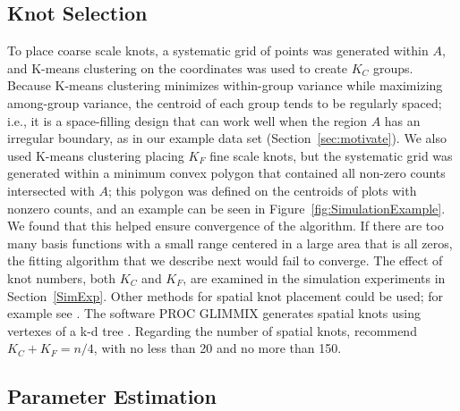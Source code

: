 \documentclass[12pt, titlepage]{article}\usepackage[]{graphicx}\usepackage[]{color}
\begin{document}
\subsection{Knot Selection}\label{sec:Knots}

To place coarse scale knots, a systematic grid of points was generated within $A$, and K-means clustering \citep{MacQ:some:1967} on the coordinates was used to create $K_C$ groups.  Because K-means clustering minimizes within-group variance while maximizing among-group variance, the centroid of each group tends to be regularly spaced; i.e., it is a space-filling design that can work well when the region $A$ has an irregular boundary, as in our example data set (Section~\ref{sec:motivate}).  We also used K-means clustering placing $K_F$ fine scale knots, but the systematic grid was generated within a minimum convex polygon that contained all non-zero counts intersected with $A$; this polygon was defined on the centroids of plots with nonzero counts, and an example can be seen in Figure~\ref{fig:SimulationExample}.  We found that this helped ensure convergence of the algorithm.  If there are too many basis functions with a small range centered in a large area that is all zeros, the fitting algorithm that we describe next would fail to converge.  The effect of knot numbers, both $K_C$ and $K_F$, are examined in the simulation experiments in Section~\ref{SimExp}.  Other methods for spatial knot placement could be used; for example see \citet{Nych:Salt:desi:1998}. The software PROC GLIMMIX \citep{SAS:stat:2008} generates spatial knots using vertexes of a k-d tree \citep{Frie:Bent:Fink:algo:1977}. Regarding the number of spatial knots, \citet[][pg. 255]{Rupp:Wand:Carr:semi:2003} recommend $K_C + K_F = n/4$, with no less than 20 and no more than 150.

\subsection{Parameter Estimation}\label{sec:Est}
\end{document}
